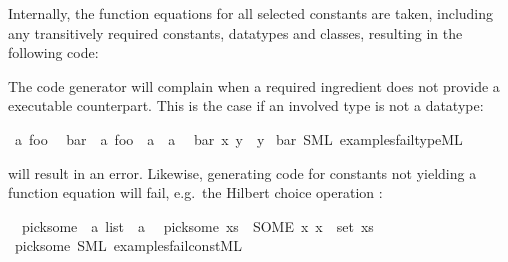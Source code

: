 \begin{isabellebody}
\begin{isamarkuptext}
  Internally, the function equations for all selected
  constants are taken, including any transitively required
  constants, datatypes and classes, resulting in the following
  code:


  The code generator will complain when a required
  ingredient does not provide a executable counterpart.
  This is the case if an involved type is not a datatype:%
\end{isamarkuptext}%
\isamarkuptrue%
%
\isadelimML
%
\endisadelimML
%
\isatagML
%
\endisatagML
{\isafoldML}%
%
\isadelimML
\isanewline
%
\endisadelimML
{}\isamarkupfalse%
\ {\isacharprime}a\ foo\isanewline
\isanewline
{}\isamarkupfalse%
\isanewline
\ \ bar\ {\isacharcolon}{\isacharcolon}\ {\isachardoublequoteopen}{\isacharprime}a\ foo\ {\isasymRightarrow}\ {\isacharprime}a\ {\isasymRightarrow}\ {\isacharprime}a{\isachardoublequoteclose}\isanewline
\ \ {\isachardoublequoteopen}bar\ x\ y\ {\isacharequal}\ y{\isachardoublequoteclose}\isanewline
%
\isadelimML
%
\endisadelimML
%
\isatagML
%
\endisatagML
{\isafoldML}%
%
\isadelimML
%
\endisadelimML
\isanewline
{}\isamarkupfalse%
\ bar\ {\isacharparenleft}SML\ {\isachardoublequoteopen}examples{\isacharslash}fail{\isacharunderscore}type{\isachardot}ML{\isachardoublequoteclose}{\isacharparenright}%
\begin{isamarkuptext}%
\noindent will result in an error. Likewise, generating code
  for constants not yielding
  a function equation will fail, e.g.~the Hilbert choice
  operation :%
\end{isamarkuptext}%
\isamarkuptrue%
%
\isadelimML
%
\endisadelimML
%
\isatagML
%
\endisatagML
{\isafoldML}%
%
\isadelimML
\isanewline
%
\endisadelimML
{}\isamarkupfalse%
\isanewline
\ \ pick{\isacharunderscore}some\ {\isacharcolon}{\isacharcolon}\ {\isachardoublequoteopen}{\isacharprime}a\ list\ {\isasymRightarrow}\ {\isacharprime}a{\isachardoublequoteclose}\isanewline
\ \ {\isachardoublequoteopen}pick{\isacharunderscore}some\ xs\ {\isacharequal}\ {\isacharparenleft}SOME\ x{\isachardot}\ x\ {\isasymin}\ set\ xs{\isacharparenright}{\isachardoublequoteclose}\isanewline
%
\isadelimML
%
\endisadelimML
%
\isatagML
%
\endisatagML
{\isafoldML}%
%
\isadelimML
%
\endisadelimML
\isanewline
{}\isamarkupfalse%
\ pick{\isacharunderscore}some\ {\isacharparenleft}SML\ {\isachardoublequoteopen}examples{\isacharslash}fail{\isacharunderscore}const{\isachardot}ML{\isachardoublequoteclose}{\isacharparenright}%

\end{isabellebody}
